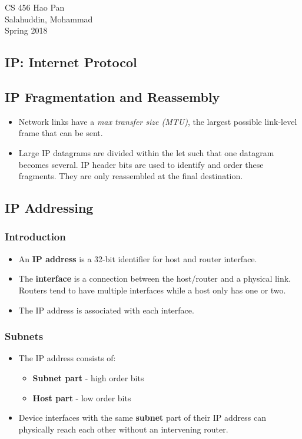 \documentclass{article}
\begin{document}
\noindent
{CS 456 \hfill Hao Pan}\\
{Salahuddin, Mohammad}\\
{Spring 2018}


\begin{center}
\section{IP: Internet Protocol}
\noindent
\end{center}

\subsection{IP Fragmentation and Reassembly}

\begin{itemize}
\item Network links have a \emph{max transfer size (MTU)}, the largest possible link-level frame that can be sent.
\item Large IP datagrams are divided within the let such that one datagram becomes several. IP header bits are used to identify and order these fragments. They are only reassembled at the final destination.
\end{itemize}

\subsection{IP Addressing}

\subsubsection{Introduction}
\begin{itemize}
\item An {\bf IP address} is a 32-bit identifier for host and router interface.
\item The {\bf interface} is a connection between the host/router and a physical link. Routers tend to have multiple interfaces while a host only has one or two.
\item The IP address is associated with each interface.
\end{itemize}

\subsubsection{Subnets}
\begin{itemize}
\item The IP address consists of:
\begin{itemize}
\item {\bf Subnet part} - high order bits
\item {\bf Host part} - low order bits
\end{itemize}
\item Device interfaces with the same {\bf subnet} part of their IP address can physically reach each other without an intervening router.
\end{itemize}
\end{document}
